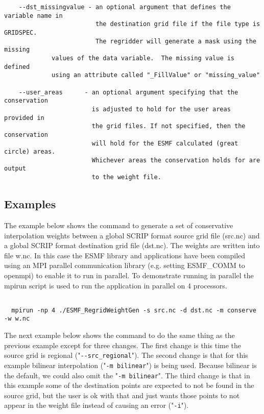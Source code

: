 \begin{verbatim}
    --dst_missingvalue - an optional argument that defines the variable name in
                         the destination grid file if the file type is GRIDSPEC. 
                         The regridder will generate a mask using the missing 
			 values of the data variable.  The missing value is defined
			 using an attribute called "_FillValue" or "missing_value"

    --user_areas      - an optional argument specifying that the conservation
                        is adjusted to hold for the user areas provided in 
                        the grid files. If not specified, then the conservation
                        will hold for the ESMF calculated (great circle) areas. 
                        Whichever areas the conservation holds for are output
                        to the weight file. 
\end{verbatim}


\subsection{Examples}

The example below shows the command to generate a set of conservative interpolation weights between a global 
SCRIP format source grid file (src.nc) and a global SCRIP format destination grid file (dst.nc). The weights
are written into file w.nc. In this case the
ESMF library and applications have been compiled using an MPI parallel communication library 
(e.g. setting ESMF\_COMM to openmpi) to enable it to run in parallel. To demonstrate running in parallel
the mpirun script is used to run the application in parallel on 4 processors. 

\begin{verbatim}

  mpirun -np 4 ./ESMF_RegridWeightGen -s src.nc -d dst.nc -m conserve -w w.nc

\end{verbatim}

The next example below shows the command to do the same thing as the previous example except for three changes. The first 
change is this time the source grid is regional ("{\tt \verb+--+src\_regional}"). The second change is that
for this example bilinear interpolation ("{\tt -m bilinear}") is being used. Because bilinear is the default, we could also
omit the "{\tt -m bilinear}". The third change is that in this example some of the destination points are expected to
not be found in the source grid, but the user is ok with that and just wants those points to not appear in the weight file instead of causing an error ("{\tt -i}"). 

